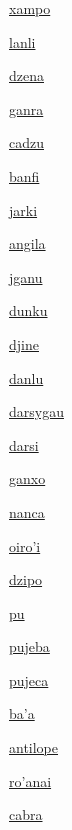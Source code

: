 {\hyperlink{val:xampo}{xampo}}{}{}{}

{\hyperlink{val:lanli}{lanli}}{}{}{}

{\hyperlink{val:dzena}{dzena}}{}{}{}

{\hyperlink{val:ganra}{ganra}}{}{}{}

{\hyperlink{val:cadzu}{cadzu}}{}{}{}

{\hyperlink{val:banfi}{banfi}}{}{}{}

{\hyperlink{val:jarki}{jarki}}{}{}{}

{\hyperlink{val:angila}{angila}}{}{}{}

{\hyperlink{val:jganu}{jganu}}{}{}{}

{\hyperlink{val:dunku}{dunku}}{}{}{}

{\hyperlink{val:djine}{djine}}{}{}{}

{\hyperlink{val:danlu}{danlu}}{}{}{}

{\hyperlink{val:darsygau}{darsygau}}{}{}{}

{\hyperlink{val:darsi}{darsi}}{}{}{}

{\hyperlink{val:ganxo}{ganxo}}{}{}{}

{\hyperlink{val:nanca}{nanca}}{}{}{}

{\hyperlink{val:oirohi}{oiro'i}}{}{}{}

{\hyperlink{val:dzipo}{dzipo}}{}{}{}

{\hyperlink{val:pu}{pu}}{}{}{}

{\hyperlink{val:pujeba}{pujeba}}{}{}{}

{\hyperlink{val:pujeca}{pujeca}}{}{}{}

{\hyperlink{val:baha}{ba'a}}{}{}{}

{\hyperlink{val:antilope}{antilope}}{}{}{}

{\hyperlink{val:rohanai}{ro'anai}}{}{}{}

{\hyperlink{val:cabra}{cabra}}{}{}{}

